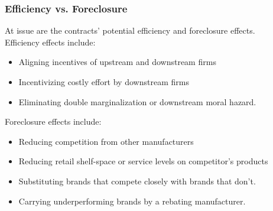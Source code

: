\documentclass[aspectratio=169]{beamer}
\begin{document}
\begin{frame}
\frametitle{Efficiency vs. Foreclosure}
\small
At issue are the contracts' potential efficiency and foreclosure effects.\\
\vfill
Efficiency effects include:
\begin{itemize}\small
\item Aligning incentives of upstream and downstream firms
\item Incentivizing costly effort by downstream firms
\item Eliminating double marginalization or downstream moral hazard.
\end{itemize} 
Foreclosure effects include:
\begin{itemize}\small
\item Reducing competition from other manufacturers
\item Reducing retail shelf-space or service levels on competitor's products
\item Substituting brands that compete closely with brands that don't.
\item Carrying underperforming brands by a rebating manufacturer.
\end{itemize} 
\end{frame}
\end{document}
